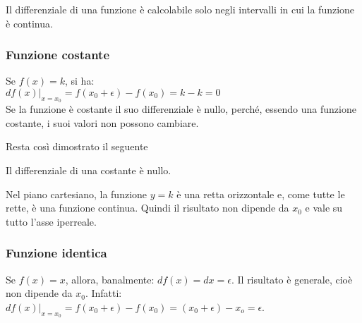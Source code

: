 \begin{osservazione}
 Il differenziale di una funzione è calcolabile solo negli intervalli in cui
 la funzione è continua.
\end{osservazione}

\subsubsection{Funzione costante}
\label{subsubsec:diff01_diffcostante}
Se $f(x)=k$, si ha:\\
$df(x)|_{x=x_0}=f(x_0+\epsilon)-f(x_0)=k-k=0$\\
Se la funzione è costante il suo differenziale è nullo,
perché, essendo una funzione costante, i suoi valori non possono cambiare. 

\begin{inaccessibleblock}
 \begin{center}
 \begin{minipage}[]{.38 \textwidth}
  \diffcostante
 \end{minipage} 
 \hfill
 \begin{minipage}[]{.58 \textwidth}
Resta così dimostrato il seguente   
\begin{teorema}
Il differenziale di una costante è nullo.
\end{teorema}
Nel piano cartesiano, la funzione  $y=k$ è una retta orizzontale e, come tutte
le rette, è una funzione continua. Quindi il risultato non dipende da $x_0$ e
vale su tutto l'asse iperreale.
 \end{minipage}
 \end{center}
\end{inaccessibleblock}

\label{fig:diff01_diffcostante}

\subsubsection{Funzione identica}
\label{subsubsec:diff01_diffidentica}
Se $f(x)=x$, allora, banalmente: $df(x)=dx=\epsilon$. Il risultato è
generale, cioè non dipende da $x_0$. Infatti:\\
$df(x)|_{x=x_0}=f(x_0+\epsilon)-f(x_0)=(x_0+\epsilon)-x_o=\epsilon$.\\ 


